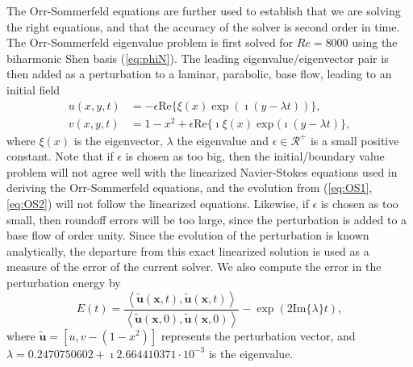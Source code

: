 \documentclass[11pt, oneside]{elsarticle}
\begin{document}
The Orr-Sommerfeld equations are further used to establish that we are solving the right equations, and that the accuracy of the solver is second order in time. The Orr-Sommerfeld eigenvalue problem is first solved for $Re=8000$ using the biharmonic Shen basis (\ref{eq:phiN}). The leading eigenvalue/eigenvector pair is then added as a perturbation to a laminar, parabolic, base flow, leading to an initial field
\begin{align}
u(x,y,t) &= -\epsilon  \mathrm{Re}\{\xi(x) \exp (\imath (y-\lambda t))\}, \label{eq:OS1} \\
v(x,y,t) &= 1-x^2 + \epsilon \mathrm{Re}\{\imath \xi(x) \exp(\imath(y-\lambda t)\}, \label{eq:OS2}
\end{align}
where $\xi(x)$ is the eigenvector, $\lambda$ the eigenvalue and $\epsilon \in \mathcal{R}^+$ is a small positive constant. Note that if $\epsilon$ is chosen as too big, then the initial/boundary value problem will not agree well with the linearized Navier-Stokes equations used in deriving the Orr-Sommerfeld equations, and the evolution from (\ref{eq:OS1}, \ref{eq:OS2}) will not follow the linearized equations. Likewise, if $\epsilon$ is chosen as too small, then roundoff errors will be too large, since the perturbation is added to a base flow of order unity.  Since the evolution of the perturbation is known analytically, the departure from this exact linearized solution is used as a measure of the error of the current solver. We also compute the error in the perturbation energy by
\begin{equation}
E(t) =  \frac{\left<\tilde{\bm{u}}(\bm{x}, t), \tilde{\bm{u}}(\bm{x}, t) \right>}{\left<\tilde{\bm{u}}(\bm{x}, 0), \tilde{\bm{u}}(\bm{x}, 0) \right>}  - \exp(2 \mathrm{Im}\{\lambda\}t), \label{eq:OSenergy}
\end{equation}
where $\tilde{\bm{u}} = [u, v-(1-x^2)]$ represents the perturbation vector, and $\lambda=0.2470750602+\imath 2.664410371\cdot 10^{-3}$ is the eigenvalue. 
\end{document}
